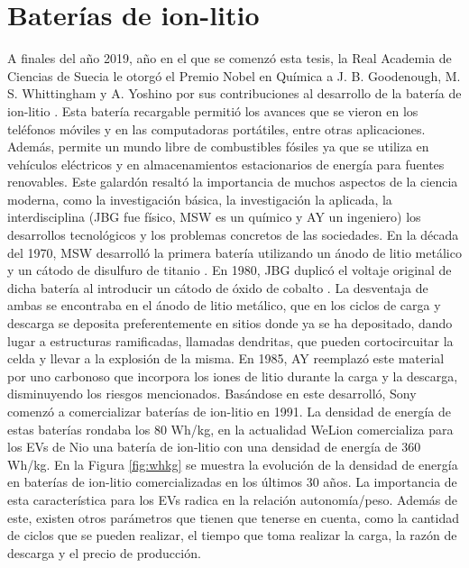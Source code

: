 \section{Baterías de ion-litio}

A finales del año 2019, año en el que se comenzó esta tesis, la Real Academia 
de Ciencias de Suecia le otorgó el Premio Nobel en Química a J. B. Goodenough, 
M. S. Whittingham y A. Yoshino por sus contribuciones al desarrollo de la batería 
de ion-litio \cite{nobel}. Esta batería recargable permitió los avances que se vieron en los 
teléfonos móviles y en las computadoras portátiles, entre otras aplicaciones.
Además, permite un mundo libre de combustibles fósiles ya que se utiliza en 
vehículos eléctricos y en almacenamientos estacionarios de energía para fuentes
renovables. Este galardón resaltó la importancia de muchos aspectos de la ciencia
moderna, como la investigación básica, la investigación la aplicada, la 
interdisciplina (JBG fue físico, MSW es un químico y AY un ingeniero) los 
desarrollos tecnológicos y los problemas concretos de las sociedades.
En la década del 1970, MSW desarrolló la primera batería utilizando un ánodo de
litio metálico y un cátodo de disulfuro de titanio \cite{whittingham1976}. En 
1980, JBG duplicó el voltaje original de dicha batería al introducir un cátodo 
de óxido de cobalto \cite{mizushima1980}.
La desventaja de ambas se encontraba en el ánodo de litio metálico, que en los 
ciclos de carga y descarga se deposita preferentemente en sitios donde ya se 
ha depositado, dando lugar a estructuras ramificadas, llamadas dendritas, que 
pueden cortocircuitar la celda y llevar a la explosión de la misma. En 1985,
AY reemplazó este material por uno carbonoso que incorpora los iones de litio
durante la carga y la descarga, disminuyendo los riesgos mencionados. Basándose
en este desarrolló, Sony comenzó a comercializar baterías de ion-litio en 1991.
La densidad de energía de estas baterías rondaba los 80 Wh/kg, en la actualidad
WeLion comercializa para los EVs de Nio una batería de ion-litio con una 
densidad de energía de 360 Wh/kg. En la Figura \ref{fig:whkg} se muestra la 
evolución de la densidad de energía en baterías de ion-litio comercializadas 
en los últimos 30 años. La importancia de esta característica para los EVs 
radica en la relación autonomía/peso. Además de este, existen otros parámetros 
que tienen que tenerse en cuenta, como la cantidad de ciclos que se pueden 
realizar, el tiempo que toma realizar la carga, la razón de descarga y el 
precio de producción.
